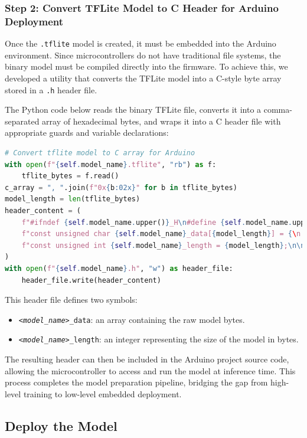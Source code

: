 \subsubsection*{Step 2: Convert TFLite Model to C Header for Arduino Deployment}

Once the \texttt{.tflite} model is created, it must be embedded into the Arduino environment. Since microcontrollers do not have traditional file systems, the binary model must be compiled directly into the firmware. To achieve this, we developed a utility that converts the TFLite model into a C-style byte array stored in a \texttt{.h} header file.

The Python code below reads the binary TFLite file, converts it into a comma-separated array of hexadecimal bytes, and wraps it into a C header file with appropriate guards and variable declarations:

\begin{lstlisting}[language=Python, caption={Convert a TFLite model to a C header array for Arduino deployment}, label=lst:tflite_to_c_array]
# Convert tflite model to C array for Arduino
with open(f"{self.model_name}.tflite", "rb") as f:
    tflite_bytes = f.read()
c_array = ", ".join(f"0x{b:02x}" for b in tflite_bytes)
model_length = len(tflite_bytes)
header_content = (
    f"#ifndef {self.model_name.upper()}_H\n#define {self.model_name.upper()}_H\n\n"
    f"const unsigned char {self.model_name}_data[{model_length}] = {\n    {c_array}\n}};\n"
    f"const unsigned int {self.model_name}_length = {model_length};\n\n#endif"
)
with open(f"{self.model_name}.h", "w") as header_file:
    header_file.write(header_content)
\end{lstlisting}

This header file defines two symbols:
\begin{itemize}
    \item \texttt{\textit{<model\_name>}\_data}: an array containing the raw model bytes.
    \item \texttt{\textit{<model\_name>}\_length}: an integer representing the size of the model in bytes.
\end{itemize}

The resulting header can then be included in the Arduino project source code, allowing the microcontroller to access and run the model at inference time. This process completes the model preparation pipeline, bridging the gap from high-level training to low-level embedded deployment.


\subsection{Deploy the Model}

